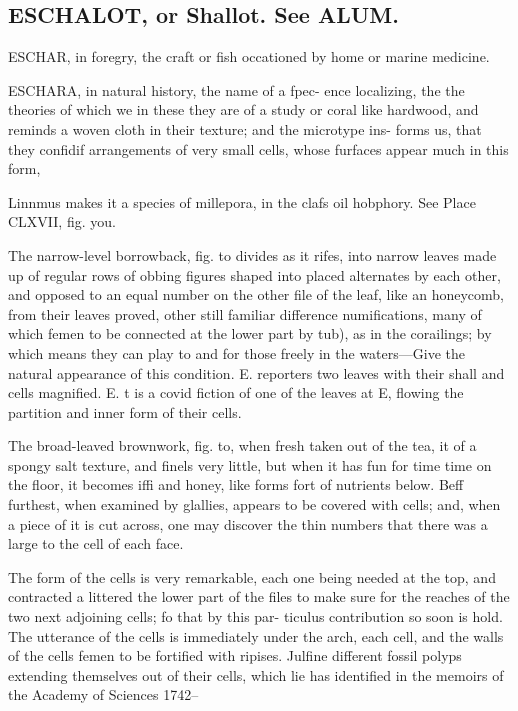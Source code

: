 \subsection*{ESCHALOT, or Shallot. See ALUM.}
ESCHAR, in foregry, the craft or fish occationed
by home or marine medicine.\par\medskip
ESCHARA, in natural history, the name of a fpec-
ence localizing, the the theories of which we in these
they are of a study or coral like hardwood, and reminds
a woven cloth in their texture; and the microtype ins-
forms us, that they confidif arrangements of very
small cells, whose furfaces appear much in this form,\par\medskip
Linnmus makes it a species of millepora, in the clafs
oil hobphory. See Place CLXVII, fig. you.\par\medskip
The narrow-level borrowback, fig. to divides as it
rifes, into narrow leaves made up of regular rows of
obbing figures shaped into placed alternates by each
other, and opposed to an equal number on the other
file of the leaf, like an honeycomb, from their leaves
proved, other still familiar difference numifications,
many of which femen to be connected at the lower part
by tub), as in the corailings; by which means they
can play to and for those freely in the waters—Give
the natural appearance of this condition. E. reporters
two leaves with their shall and cells magnified. E. t
is a covid fiction of one of the leaves at E, flowing the
partition and inner form of their cells.\par\medskip
The broad-leaved brownwork, fig. to, when fresh
taken out of the tea, it of a spongy salt texture, and
finels very little, but when it has fun for time time
on the floor, it becomes iffi and honey, like forms fort
of nutrients below. Beff furthest, when examined by
glallies, appears to be covered with cells; and, when a
piece of it is cut across, one may discover the thin
numbers that there was a large to the cell of each face.\par\medskip
The form of the cells is very remarkable, each
one being needed at the top, and contracted a littered
the lower part of the files to make sure for the reaches
of the two next adjoining cells; fo that by this par-
ticulus contribution so soon is hold. The utterance
of the cells is immediately under the arch, each cell,
and the walls of the cells femen to be fortified with
ripises. Julfine different fossil polyps extending
themselves out of their cells, which lie has identified
in the memoirs of the Academy of Sciences 1742--
